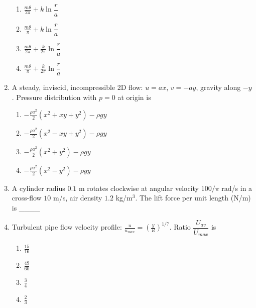 \documentclass[journal,12pt,onecolumn]{IEEEtran}
\begin{document}
\begin{enumerate}[label=\arabic*)]
\begin{enumerate}[label=\alph*)]
\item $\frac{m\theta}{2\pi} + k \ln\dfrac{r}{a}$
\item $\frac{m\theta}{\pi} + k \ln\dfrac{r}{a}$
\item $\frac{m\theta}{2\pi} + \frac{k}{2\pi}\ln\dfrac{r}{a}$
\item $\frac{m\theta}{\pi} + \frac{k}{2\pi}\ln\dfrac{r}{a}$
\end{enumerate}

\newpage

\item A steady, inviscid, incompressible 2D flow: $u = ax$, $v = -ay$, gravity along $-y$. Pressure distribution with $p=0$ at origin is
\hfill{} \\

\vspace{0.2cm}
\begin{enumerate}[label=\alph*)]
\item $-\frac{\rho a^2}{2}(x^2+xy+y^2) - \rho gy$
\item $-\frac{\rho a^2}{2}(x^2 - xy + y^2) - \rho gy$
\item $-\frac{\rho a^2}{2}(x^2+y^2) - \rho gy$
\item $-\frac{\rho a^2}{2}(x^2 - y^2) - \rho gy$
\end{enumerate}
\vspace{0.5cm}

\item A cylinder radius $0.1$ m rotates clockwise at angular velocity $100/\pi$ rad/s in a cross-flow $10$ m/s, air density $1.2$ kg/m$^3$. The lift force per unit length (N/m) is \_\_\_\_
\hfill{} \\

\vspace{0.5cm}

\item Turbulent pipe flow velocity profile: $\displaystyle \frac{u}{u_{max}} = \left(\frac{y}{R}\right)^{1/7}$. Ratio $\dfrac{U_{av}}{U_{max}}$ is  
\hfill{} \\

\vspace{0.2cm}
\begin{enumerate}[label=\alph*)]
\item $\frac{15}{16}$
\vspace{0.1cm}
\item $\frac{49}{60}$
\vspace{0.1cm}
\item $\frac{3}{4}$
\vspace{0.1cm}
\item $\frac{2}{3}$
\end{enumerate}
\vspace{0.5cm}


\end{enumerate}
\end{document}
